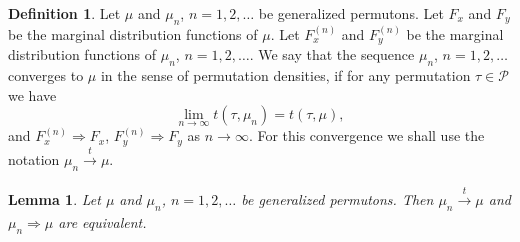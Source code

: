 \documentclass[12pt,twoside]{article}
\theoremstyle{definition}
\newtheorem{definition}[theorem]{Definition}
\theoremstyle{remark}
\numberwithin{equation}{section}
\theoremstyle{plain}
\newtheorem{lem}{Lemma}[section]
\theoremstyle{remark}
\def\PD{{\mathcal P}}                     \def\PDW{{\tilde{\cal P}}}
\def\PD{{\mathcal P}}
\begin{document}
\begin{definition}  \label{deftconv}
Let $\mu$  and $\mu_n$, $n=1,2, \dots$ be  generalized permutons.
Let $F_x$ and $F_y$ be the marginal distribution functions of $\mu$.
Let $F^{(n)}_x$ and $F^{(n)}_y$ be the marginal distribution functions of $\mu_n$, $n=1,2, \dots$.
We say that the sequence $\mu_n$, $n=1,2, \dots$ converges to $\mu$  in the sense of permutation 
densities, if for any permutation $\tau\in \PD$ we have
$$
\lim_{n\to \infty} t(\tau, \mu_n) = t(\tau, \mu),
$$
and $F^{(n)}_x \Rightarrow F_x$, $F^{(n)}_y \Rightarrow F_y$ as $n\to \infty$.
For this convergence we shall use the notation $\mu_n \xrightarrow[]{t} \mu$.
\end{definition}
%

\begin{lem}  \label{H5.3}
Let $\mu$  and $\mu_n$, $n=1,2, \dots$ be  generalized permutons.
Then
$\mu_n \xrightarrow[]{t} \mu$ and $\mu_n \Rightarrow \mu$ are equivalent.
\end{lem}  
%
\end{document}
